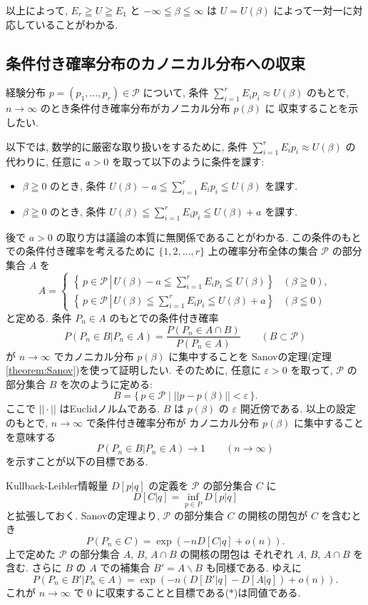 \documentclass[12pt,twoside]{jarticle}
\newcommand\eps{\varepsilon}
\renewcommand\setminus{\smallsetminus}
\newcommand\cP{{\mathcal P}}
\theoremstyle{definition} %
\theoremstyle{definition} %
\theoremstyle{definition} %
\numberwithin{theorem}{section}
\numberwithin{equation}{section}
\numberwithin{figure}{section}
\numberwithin{table}{section}
\newcommand\theoremref[1]{定理\ref{#1}}
\begin{document}
以上によって, $E_r\geqq U\geqq E_1$ と $-\infty\leqq\beta\leqq\infty$
は $U=U(\beta)$ によって一対一に対応していることがわかる.


\subsection{条件付き確率分布のカノニカル分布への収束}

経験分布 $p=(p_1,\ldots,p_r)\in\cP$ について, 
条件 $\sum_{i=1}^r E_i p_i\approx U(\beta)$ のもとで,  
$n\to\infty$ のとき条件付き確率分布がカノニカル分布 $p(\beta)$ に
収束することを示したい.

以下では, 数学的に厳密な取り扱いをするために,
条件 $\sum_{i=1}^r E_i p_i\approx U(\beta)$ の代わりに,
任意に $a>0$ を取って以下のように条件を課す:
\begin{itemize}
\item $\beta\geqq 0$ のとき, 条件 \(
\displaystyle
U(\beta)-a \leqq \sum_{i=1}^r E_i p_i \leqq U(\beta)
\) を課す. 
\item $\beta\geqq 0$ のとき, 条件 \(
\displaystyle
U(\beta)\leqq \sum_{i=1}^r E_i p_i \leqq U(\beta)+a
\) を課す. 
\end{itemize}
後で $a>0$ の取り方は議論の本質に無関係であることがわかる.
この条件のもとでの条件付き確率を考えるために
$\{1,2,\ldots,r\}$ 上の確率分布全体の集合 $\cP$ の部分集合 $A$ を
\[
A =
\begin{cases}
\left\{\,p\in\cP \,\left|\, 
U(\beta)-a \leqq \sum_{i=1}^r E_i p_i \leqq U(\beta) \right.\right\} 
& (\beta\geqq 0), 
\\
\left\{\, p\in\cP \,\left|\, 
U(\beta)\leqq \sum_{i=1}^r E_i p_i \leqq U(\beta)+a \right.\right\} 
& (\beta\leqq 0)
\end{cases}
\]
と定める. 条件 $P_n\in A$ のもとでの条件付き確率
\[
P(P_n\in B|P_n\in A)=\frac{P(P_n\in A\cap B)}{P(P_n\in A)}
\qquad (B\subset\cP)
\]
が $n\to\infty$ でカノニカル分布 $p(\beta)$ に集中することを
Sanovの定理(\theoremref{theorem:Sanov})を使って証明したい. 
そのために, 任意に $\eps>0$ を取って, 
$\cP$ の部分集合 $B$ を次のように定める:
\[
B = \{\,p\in\cP \mid ||p-p(\beta)||<\eps \,\}.
\]
ここで $||\cdot||$ はEuclidノルムである.
$B$ は $p(\beta)$ の $\eps$ 開近傍である.
以上の設定のもとで, $n\to\infty$ で条件付き確率分布が
カノニカル分布 $p(\beta)$ に集中することを意味する
\[
P(P_n\in B|P_n\in A)\to 1
\qquad (n\to\infty)
\tag{$*$}
\]
を示すことが以下の目標である.

Kullback-Leibler情報量 $D[p|q]$ の定義を $\cP$ の部分集合 $C$ に
\[
D[C|q] = \inf_{p\in P}D[p|q]
\]
と拡張しておく. 
Sanovの定理より, $\cP$ の部分集合 $C$ の開核の閉包が $C$ を含むとき 
\[
P(P_n\in C) = \exp(-n D[C|q] + o(n)).
\]
上で定めた $\cP$ の部分集合 $A$, $B$, $A\cap B$ の開核の閉包は
それぞれ $A$, $B$, $A\cap B$ を含む. 
さらに $B$ の $A$ での補集合 $B'=A\setminus B$ も同様である.
ゆえに
\[
P(P_n\in B'|P_n\in A)
=\exp(-n(D[B'|q]-D[A|q])+o(n)).
\]
これが $n\to\infty$ で $0$ に収束することと目標である($*$)は同値である.
\end{document}
